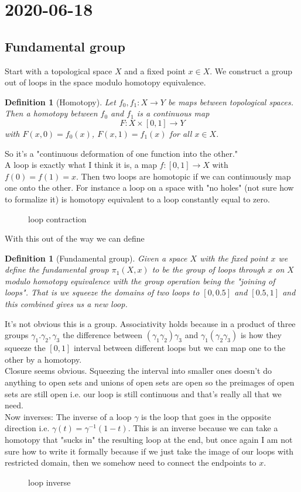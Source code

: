 \documentclass[a4paper]{article}
\newtheorem{defn}[thm]{Definition}
\begin{document}
\section*{ 2020-06-18}
\subsection*{Fundamental group}
Start with a topological space $X$ and a fixed point $x\in X$. We construct a group out of loops in the space modulo homotopy equivalence.
\begin{defn}[Homotopy]
    Let $f_0,f_1:X\to Y $ be maps between topological spaces. Then a homotopy between $f_0$ and $f_1$ is a continuous map \[F:X \times \left[ 0,1 \right] \to Y\] with $F(x,0)=f_0(x)$, $F(x,1)=f_1(x)$ for all $x\in X$.
\end{defn}
So it's a "continuous deformation of one function into the other."\\
A loop is exactly what I think it is, a map $f: \left[ 0,1 \right] \to X$ with $f( 0)=f(1)=x$.
Then two loops are homotopic if we can continuously map one onto the other. For instance a loop on a space with "no holes" (not sure how to formalize it) is homotopy equivalent to a loop constantly equal to zero.\\
\begin{figure}[ht]
    \centering
    \caption{loop contraction}
    \label{fig:loopcontract}
\end{figure}
With this out of the way we can define
\begin{defn}[Fundamental group]
    Given a space $X$ with the fixed point $x$ we define the fundamental group $\pi_1(X,x)$ to be the group of loops through $x$ on $X$ modulo homotopy equivalence with the group operation being the "joining of loops". That is we squeeze the domains of two loops to $\left[ 0,0.5 \right] $ and $\left[ 0.5,1 \right] $ and this combined gives us a new loop.
\end{defn}
It's not obvious this is a group. Associativity holds because in a product of three groups  $\gamma_1.\gamma_2,\gamma_3$ the difference between $\left( \gamma_1\gamma_2 \right)\gamma_3 $ and $\gamma_1\left( \gamma_2\gamma_3 \right) $ is how they squeeze the $\left[ 0,1 \right] $ interval between different loops but we can map one to the other by a homotopy.\\
Closure seems obvious. Squeezing the interval into smaller ones doesn't do anything to open sets and unions of open sets are open so the preimages of open sets are still open i.e. our loop is still continuous and that's really all that we need.\\
Now inverses: The inverse of a loop $\gamma$ is the loop that goes in the opposite direction i.e.  $\gamma(t)=\gamma^{-1}(1-t)$. This is an inverse because we can take a homotopy that "sucks in" the resulting loop at the end, but once again I am not sure how to write it formally because if we just take the image of our loops with restricted domain, then we somehow need to connect the endpoints to  $x$.
\begin{figure}[ht]
    \centering
    \caption{loop inverse}
    \label{fig:loop_inverse}
\end{figure}
\end{document}
